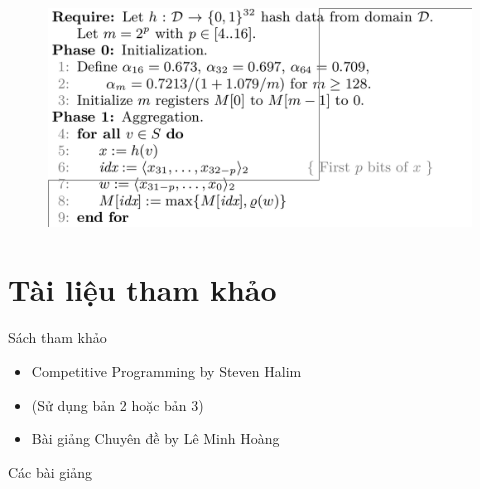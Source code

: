 \documentclass{beamer}
\newcommand{\bi}{\begin{itemize}}
\newcommand{\ei}{\end{itemize}}
\begin{document}
\begin{frame}
\begin{figure}[H]
\includegraphics[scale=0.3]{HLL1.png}
\end{figure}
\end{frame}
\section*{Tài liệu tham khảo}

\begin{frame}{Sách tham khảo}
    \vspace{20pt}

    \bi
        \item {\color{hilight}Competitive Programming} by Steven Halim
        \item[] (Sử dụng bản 2 hoặc bản 3)
        \vspace{10pt}
        \item {\color{hilight}Bài giảng Chuyên đề} by Lê Minh Hoàng
    \ei
\end{frame}

\begin{frame}{Các bài giảng}
 
\end{frame}

\end{document}
